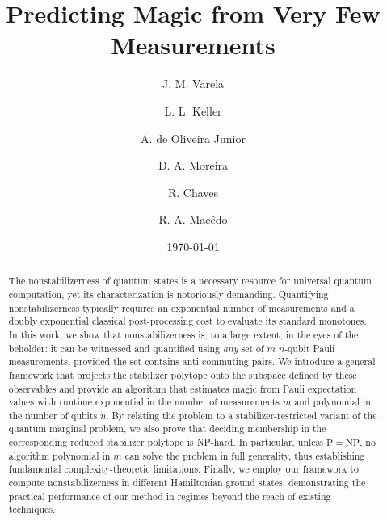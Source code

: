 \documentclass[10pt,aps,pra,twocolumn,floatfix,nofootinbib,superscriptaddress,longbibliography]{revtex4-2}
\newcommand{\1}{\mathbbm{1}}
\begin{document}
\title{Predicting Magic from Very Few Measurements}


\author{J. M. Varela}
\author{L. L. Keller}
\author{A. de Oliveira Junior}
\author{D. A. Moreira}
\author{R. Chaves}
\author{R. A. Macêdo}
\date{\today}


\begin{abstract}
The nonstabilizerness of quantum states is a necessary resource for universal quantum computation, yet its characterization is notoriously demanding. Quantifying nonstabilizerness typically requires an exponential number of measurements and a doubly exponential classical post-processing cost to evaluate its standard monotones. In this work, we show that nonstabilizerness is, to a large extent, in the eyes of the beholder: it can be witnessed and quantified using \emph{any} set of $m$ $n$-qubit Pauli measurements, provided the set contains anti-commuting pairs. We introduce a general framework that projects the stabilizer polytope onto the subspace defined by these observables and provide an algorithm that estimates magic from Pauli expectation values with runtime exponential in the number of measurements $m$ and polynomial in the number of qubits $n$. By relating the problem to a stabilizer-restricted variant of the quantum marginal problem, we also prove that deciding membership in the corresponding reduced stabilizer polytope is NP-hard. In particular, unless $\mathrm{P} = \mathrm{NP}$, no algorithm polynomial in $m$ can solve the problem in full generality, thus establishing fundamental complexity-theoretic limitations. Finally, we employ our framework to compute nonstabilizerness in different Hamiltonian ground states, demonstrating the practical performance of our method in regimes beyond the reach of existing techniques.
\end{abstract}
\end{document}
